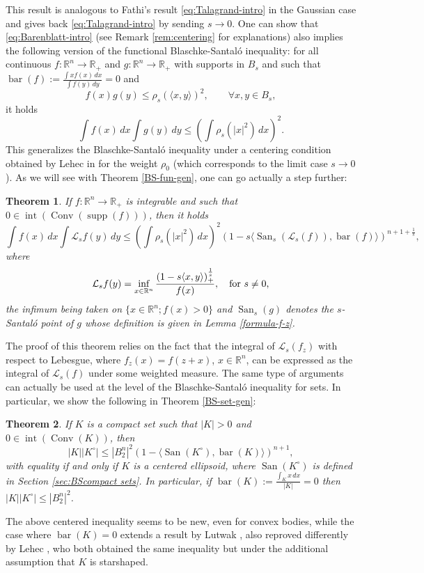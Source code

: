 \documentclass[10pt]{amsart}
\newtheorem*{intro_thm}{Theorem}
\theoremstyle{definition}
\theoremstyle{remark}
\newcommand{\R}{\mathbb{R}}
\renewcommand{\L}{\mathcal{L}}
\newcommand{\conv}{\operatorname{Conv}}
\newcommand{\inte}{\operatorname{int}}
\newcommand{\supp}{\operatorname{supp}}
\newcommand{\bary}{\operatorname{bar}}
\newcommand{\san}{\operatorname{San}}
\begin{document}
This result is analogous to Fathi's result \eqref{eq:Talagrand-intro} in the Gaussian case and gives back \eqref{eq:Talagrand-intro} by sending $s \to 0$.
One can show that \eqref{eq:Barenblatt-intro} (see Remark \ref{rem:centering} for explanations) also implies the following version of the functional Blaschke-Santal\'o inequality: for all continuous $f:\R^n\to\R_+$ and $g:\R^n \to \R_+$ with supports in $B_s$ and such that $\bary(f):= \frac{\int xf(x)\,dx}{\int f(y)\,dy}=0$ and  
\begin{equation}\label{eq:fgrho_s}
f(x)g(y) \leq \rho_s(\langle x,y \rangle)^2 ,\qquad \forall x,y\in B_s,
\end{equation}
it holds 
\[
\int f(x)\,dx \int g(y)\,dy \leq \left(\int \rho_s(|x|^2)\,dx\right)^2.
\]
This generalizes the Blaschke-Santal\'o inequality under a centering condition obtained by Lehec in \cite{lehec3}  for the weight $\rho_0$ (which corresponds to the limit case $s\to0$). As we will see with Theorem \ref{BS-fun-gen}, one can go actually a step further: 

\begin{intro_thm}
    If $f:\R^n\to\R_+$ is integrable and such that $0\in \inte(\conv(\supp(f)))$, then it holds
    \[
    \int f(x)\,dx\int \L_s f(y)\,dy\le \left(\int \rho_s(|x|^2)\,dx\right)^2    (1-s\langle \san_s(\L_s(f)),\bary(f)\rangle)^{n+1+\frac{1}{s}},
    \]
    where 
    \[
    \L_s f(y)=\inf_{x\in\R^n}\frac{\left(1-s\langle x,y\rangle\right)_+^\frac{1}{s}}{f(x)},\quad \hbox{for $s\neq 0$,}
    \]
    the infimum being taken on $\{x\in\R^n; f(x)>0\}$ and $\san_s(g)$ denotes the $s$-Santal\'o point of $g$ whose definition is given in Lemma \ref{formula-f-z}.
\end{intro_thm}
The proof of this theorem relies on the fact that the integral of $\L_s(f_z)$ with respect to Lebesgue, where $f_z(x)=f(z+x)$, $x\in \R^n$, can be expressed as the integral of $\L_s(f)$ under some weighted measure. The same type of arguments can actually be used at the level of the Blaschke-Santal\'o inequality for sets. 
In particular, we show the following in Theorem \ref{BS-set-gen}: 
\begin{intro_thm}
    If $K$ is a compact set such that $|K|>0$ and $0\in \inte(\conv(K))$, then 
\[
|K||K^\circ|\le|B_2^n|^2(1-\langle \san(K^\circ),\bary(K)\rangle)^{n+1},
\]
with equality if and only if $K$ is a centered ellipsoid, where $\san(K^\circ)$ is defined in Section \ref{sec:BScompact sets}.
In particular, if $\bary(K):=\frac{\int_K x\,dx}{|K|}=0$ then $|K||K^\circ|\le|B_2^n|^2$.
\end{intro_thm}
The above centered inequality seems to be new, even for convex bodies, while the case where $\bary(K)=0$ extends a result by Lutwak \cite{L91}, also reproved differently by Lehec \cite{lehec3}, who both obtained the same inequality but under the additional assumption that $K$ is starshaped.
\end{document}
